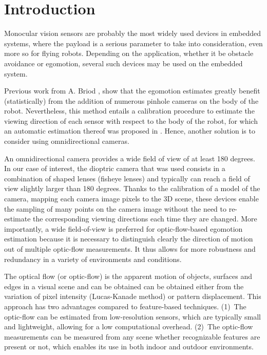 \section{Introduction}
Monocular vision sensors are probably the most widely used devices in embedded systems, where the payload is a serious parameter to take into consideration, even more so for flying robots. Depending on the application, whether it be obstacle avoidance or egomotion, several such devices may be used on the embedded system. 

Previous work from A. Briod \cite{ekf}, show that the egomotion estimates greatly benefit (statistically) from the addition of numerous pinhole cameras on the body of the robot. Nevertheless, this method entails a calibration procedure to estimate the viewing direction of each sensor with respect to the body of the robot, for which an automatic estimation thereof was proposed in \cite{autocalib}. Hence, another solution is to consider using omnidirectional cameras. 

An omnidirectional camera provides a wide field of view of at least 180 degrees. In our case of interest, the dioptric camera that was used consists in a combination of shaped lenses (fisheye lenses) and typically can reach a field of view slightly larger than 180 degrees. Thanks to the calibration of a model of the camera, mapping each camera image pixels to the 3D scene, these devices enable the sampling of many points on the camera image without the need to re-estimate the corresponding viewing directions each time they are changed. More importantly, a wide field-of-view is preferred for optic-flow-based egomotion estimation because it is necessary to distinguish clearly the direction of motion out of multiple optic-flow measurements. It thus allows for more robustness and redundancy in a variety of environments and conditions. 

The optical flow (or optic-flow) is the apparent motion of objects, surfaces and edges in a visual scene and can be obtained can be obtained either from the variation of pixel intensity (Lucas-Kanade method) or pattern displacement. This approach has two advantages compared to feature-based techniques. (1)~The optic-flow can be estimated from low-resolution sensors, which are typically small and lightweight, allowing for a low computational overhead. (2)~The optic-flow measurements can be measured from any scene whether recognizable features are present or not, which enables its use in both indoor and outdoor environments.

